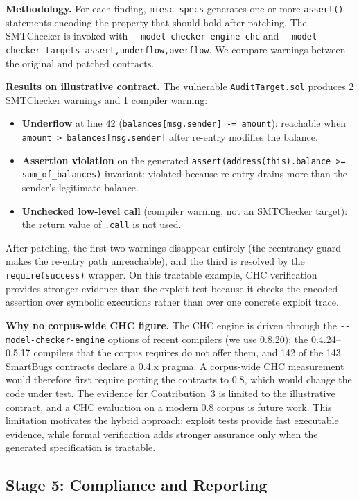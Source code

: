 \documentclass[conference]{IEEEtran}
\begin{document}
\textbf{Methodology.} For each finding, \texttt{miesc specs} generates one or more \texttt{assert()} statements encoding the property that should hold after patching. The SMTChecker is invoked with \texttt{-{}-model-checker-engine chc} and \texttt{-{}-model-checker-targets assert,underflow,overflow}. We compare warnings between the original and patched contracts.

\textbf{Results on illustrative contract.} The vulnerable \texttt{AuditTarget.sol} produces 2 SMTChecker warnings and 1 compiler warning:
\begin{itemize}
    \item \textbf{Underflow} at line 42 (\texttt{balances[msg.sender] -= amount}): reachable when \texttt{amount > balances[msg.sender]} after re-entry modifies the balance.
    \item \textbf{Assertion violation} on the generated \texttt{assert(address(this).balance >= sum\_of\_balances)} invariant: violated because re-entry drains more than the sender's legitimate balance.
    \item \textbf{Unchecked low-level call} (compiler warning, not an SMTChecker target): the return value of \texttt{.call} is not used.
\end{itemize}

After patching, the first two warnings disappear entirely (the reentrancy guard makes the re-entry path unreachable), and the third is resolved by the \texttt{require(success)} wrapper. On this tractable example, CHC verification provides stronger evidence than the exploit test because it checks the encoded assertion over symbolic executions rather than over one concrete exploit trace.

\textbf{Why no corpus-wide CHC figure.} The CHC engine is driven through the \texttt{-{}-model-checker-engine} options of recent compilers (we use 0.8.20); the 0.4.24--0.5.17 compilers that the corpus requires do not offer them, and 142 of the 143 SmartBugs contracts declare a 0.4.x pragma. A corpus-wide CHC measurement would therefore first require porting the contracts to 0.8, which would change the code under test. The evidence for Contribution~3 is limited to the illustrative contract, and a CHC evaluation on a modern 0.8 corpus is future work. This limitation motivates the hybrid approach: exploit tests provide fast executable evidence, while formal verification adds stronger assurance only when the generated specification is tractable.

\subsection{Stage 5: Compliance and Reporting}
\end{document}
